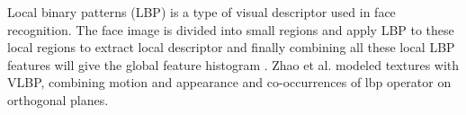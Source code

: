 \documentclass[review]{elsarticle}
\begin{document}
Local binary patterns (LBP) is a type of visual descriptor used in face recognition.
The face image is divided into small regions and apply LBP to these local regions to extract local descriptor and finally combining all these local LBP features will give the global feature histogram \cite{ahonen2006face}. Zhao et al. \cite{zhao2007dynamic} modeled textures with VLBP, combining motion and appearance and co-occurrences of lbp operator on orthogonal planes. 







\end{document}
